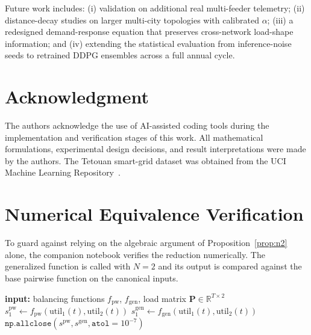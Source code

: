 \documentclass[10pt,journal]{IEEEtran}
\newcommand{\util}{\mathrm{util}}
\begin{document}
Future work includes: (i) validation on additional real multi-feeder
telemetry; (ii) distance-decay studies on larger multi-city topologies
with calibrated $\alpha$; (iii) a redesigned demand-response equation that
preserves cross-network load-shape information; and (iv) extending the
statistical evaluation from inference-noise seeds to retrained DDPG
ensembles across a full annual cycle.

\section*{Acknowledgment}
The authors acknowledge the use of AI-assisted coding tools during the
implementation and verification stages of this work. All mathematical
formulations, experimental design decisions, and result interpretations
were made by the authors. The Tetouan smart-grid dataset was obtained from
the UCI Machine Learning Repository~\cite{salam2018}.

\appendix
\section{Numerical Equivalence Verification}\label{app:equiv}
To guard against relying on the algebraic argument of
Proposition~\ref{prop:n2} alone, the companion notebook verifies the
reduction numerically. The generalized function is called with $N=2$ and
its output is compared against the base pairwise function on the canonical
inputs.

\begin{algorithm}[H]
\caption{Numerical backward-compatibility check}
\begin{algorithmic}[1]
\State \textbf{input:} balancing functions $f_{\mathrm{pw}}$, $f_{\mathrm{gen}}$, load matrix $\mathbf{P}\in\mathbb{R}^{T\times2}$
  \State $s^{\mathrm{pw}}_1 \gets f_{\mathrm{pw}}(\util_1(t),\util_2(t))$
  \State $s^{\mathrm{gen}}_1 \gets f_{\mathrm{gen}}(\util_1(t),\util_2(t))$
\EndFor
\State \Return $\texttt{np.allclose}(s^{\mathrm{pw}}, s^{\mathrm{gen}},
\texttt{atol}=10^{-7})$
\end{algorithmic}
\end{algorithm}

\end{document}
